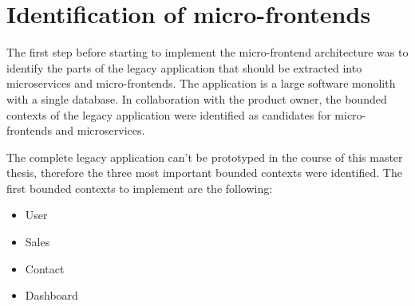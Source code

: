 \section{Identification of micro-frontends}\label{section:applied-methods:identification-micro-frontends}

The first step before starting to implement the micro-frontend architecture was to identify the parts of the legacy application that should be extracted into microservices and micro-frontends. The application is a large software monolith with a single database. In collaboration with the product owner, the bounded contexts of the legacy application were identified as candidates for micro-frontends and microservices. 

\bigskip

\noindent The complete legacy application can't be prototyped in the course of this master thesis, therefore the three most important bounded contexts were identified. The first bounded contexts to implement are the following:

\begin{itemize}
  \item User
  \item Sales
  \item Contact
  \item Dashboard
\end{itemize}